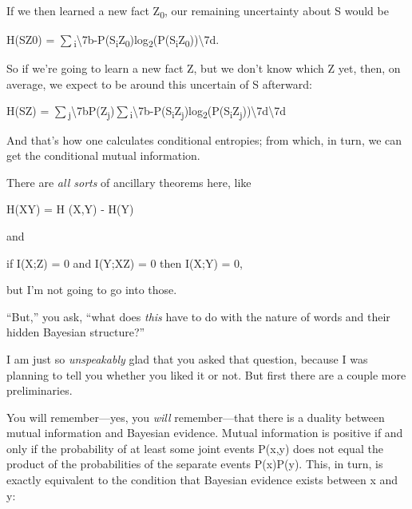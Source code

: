 \bigskip

{
 If we then learned a new fact Z\textsubscript{0}, our remaining
uncertainty about S would be}

{\centering
 H(S{\textbar}Z0) =
${\sum}$\textsubscript{i}{\textbackslash}{\textquotesingle}7b-P(S\textsubscript{i}{\textbar}Z\textsubscript{0})log\textsubscript{2}(P(S\textsubscript{i}{\textbar}Z\textsubscript{0})){\textbackslash}{\textquotesingle}7d.
\par}


\bigskip

{
 So if we're going to learn a new fact Z, but we
don't know which Z yet, then, on average, we expect to
be around this uncertain of S afterward:}

{\centering
 H(S{\textbar}Z) =
${\sum}$\textsubscript{j}{\textbackslash}{\textquotesingle}7bP(Z\textsubscript{j})${\sum}$\textsubscript{i}{\textbackslash}{\textquotesingle}7b-P(S\textsubscript{i}{\textbar}Z\textsubscript{j})log\textsubscript{2}(P(S\textsubscript{i}{\textbar}Z\textsubscript{j})){\textbackslash}{\textquotesingle}7d{\textbackslash}{\textquotesingle}7d
\par}


\bigskip

{
 And that's how one calculates conditional
entropies; from which, in turn, we can get the conditional mutual
information. }

{
 There are \textit{all sorts} of ancillary theorems here, like}

{\centering
 H(X{\textbar}Y) = H (X,Y) - H(Y)
\par}


\bigskip

{
 and}

{\centering
 if I(X;Z) = 0 and I(Y;X{\textbar}Z) = 0 then I(X;Y) = 0,
\par}


\bigskip

{
 but I'm not going to go into those. }

{
 ``But,'' you ask,
``what does \textit{this} have to do with the nature
of words and their hidden Bayesian structure?''}

{
 I am just so \textit{unspeakably} glad that you asked that
question, because I was planning to tell you whether you liked it or
not. But first there are a couple more preliminaries.}

{
 You will remember---yes, you \textit{will} remember---that there
is a duality between mutual information and Bayesian evidence. Mutual
information is positive if and only if the probability of at least some
joint events P(x,y) does not equal the product of the probabilities of
the separate events P(x)P(y). This, in turn, is exactly equivalent to
the condition that Bayesian evidence exists between x and y:}

